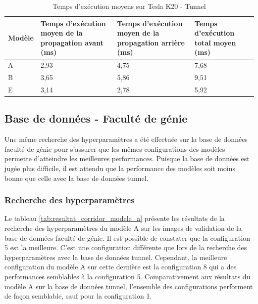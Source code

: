     \begin{table}
        \centering
        \caption{Temps d'exécution moyens sur Tesla K20 - Tunnel}
        \label{tab:resultat_tunnel_temps_execution}
        \begin{tabular}{lp{4cm}p{4cm}p{4cm}}
            \midrule
            Modèle & Temps d'exécution moyen de la propagation avant (ms) & Temps d'exécution moyen de la propagation arrière (ms) & Temps d'exécution total moyen (ms)\\
            \midrule\midrule
            A & 2,93 & 4,75 & 7,68\\
            B & 3,65 & 5,86 & 9,51\\
            E & 3,14 & 2,78 & 5,92\\
            \midrule
        \end{tabular}
    \end{table}

\subsection{Base de données - Faculté de génie}
    Une même recherche des hyperparamètres a été effectuée sur la base de données faculté de génie pour s'assurer que les mêmes configurations des modèles permette d'atteindre les meilleures performances. Puisque la base de données est jugée plus difficile, il est attendu que la performance des modèles soit moins bonne que celle avec la base de données tunnel.
    
\subsubsection{Recherche des hyperparamètres}
    Le tableau \ref{tab:resultat_corridor_modele_a} présente les résultats de la recherche des hyperparamètres du modèle A sur les images de validation de la base de données faculté de génie. Il est possible de constater que la configuration 5 est la meilleure. C'est une configuration différente que lors de la recherche des hyperparamètres avec la base de données tunnel. Cependant, la meilleure configuration du modèle A sur cette dernière est la configuration 8 qui a des performances semblables à la configuration 5. Comparativement aux résultats du modèle A sur la base de données tunnel, l'ensemble des configurations performent de façon semblable, sauf pour la configuration 1.
    \bigskip
    
